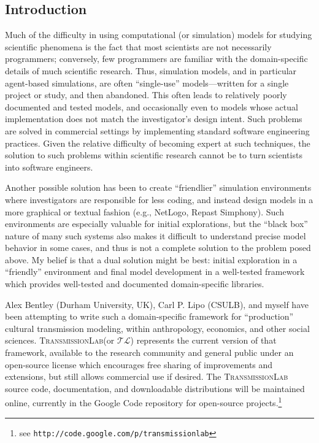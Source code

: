 \documentclass[noid]{kluwer-mem-proposal}
\newcommand{\tlfull}{\textsc{TransmissionLab}\xspace}
\newcommand{\tlshort}{\ensuremath{\mathcal{TL}}\xspace}
\begin{document}
\begin{article}
\section{Introduction}
Much of the difficulty in using computational (or simulation) models for studying scientific phenomena is the fact that most scientists are not necessarily programmers; conversely, few programmers are familiar with the domain-specific details of much scientific research.  Thus, simulation models, and in particular agent-based simulations, are often ``single-use'' models---written for a single project or study, and then abandoned.  This often leads to relatively poorly documented and tested models, and occasionally even to models whose actual implementation does not match the investigator's design intent.  Such problems are solved in commercial settings by implementing standard software engineering practices.  Given the relative difficulty of becoming expert at such techniques, the solution to such problems within scientific research cannot be to turn scientists into software engineers.  

Another possible solution has been to create ``friendlier'' simulation environments where investigators are responsible for less coding, and instead design models in a more graphical or textual fashion (e.g., NetLogo, Repast Simphony).  Such environments are especially valuable for initial explorations, but the ``black box'' nature of many such systems also makes it difficult to understand precise model behavior in some cases, and thus is not a complete solution to the problem posed above.  My belief is that a dual solution might be best:  initial exploration in a ``friendly'' environment and final model development in a well-tested framework which provides well-tested and documented domain-specific libraries.  

Alex Bentley (Durham University, UK), Carl P. Lipo (CSULB), and myself have been attempting to write such a domain-specific framework for ``production'' cultural transmission modeling, within anthropology, economics, and other social sciences.  \tlfull (or \tlshort) represents the current version of that framework, available to the research community and general public under an open-source license which encourages free sharing of improvements and extensions, but still allows commercial use if desired.  The \tlfull source code, documentation, and downloadable distributions will be maintained online, currently in the Google Code repository for open-source projects.\footnote{see \texttt{http://code.google.com/p/transmissionlab}}


\end{article}
\end{document}
